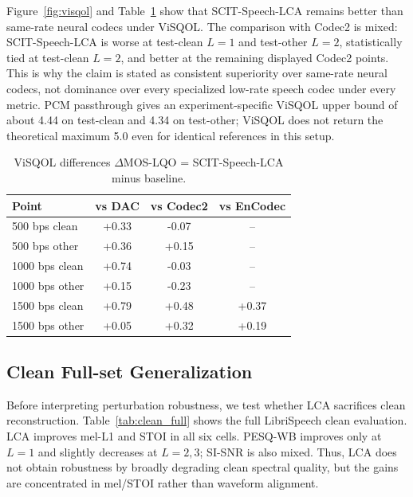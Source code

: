 \documentclass[10pt,twocolumn]{article}
\newcommand{\lca}{SCIT-Speech-LCA}
\begin{document}
Figure~\ref{fig:visqol} and Table~\ref{tab:visqol} show that \lca{} remains better than same-rate neural codecs under ViSQOL. The comparison with Codec2 is mixed: \lca{} is worse at test-clean \(L=1\) and test-other \(L=2\), statistically tied at test-clean \(L=2\), and better at the remaining displayed Codec2 points. This is why the claim is stated as consistent superiority over same-rate neural codecs, not dominance over every specialized low-rate speech codec under every metric. PCM passthrough gives an experiment-specific ViSQOL upper bound of about 4.44 on test-clean and 4.34 on test-other; ViSQOL does not return the theoretical maximum 5.0 even for identical references in this setup.

\begin{table}[t]
\centering
\caption{ViSQOL differences \(\Delta\)MOS-LQO = \lca{} minus baseline.}
\label{tab:visqol}
\small
\begin{tabular}{lccc}
\toprule
Point & vs DAC & vs Codec2 & vs EnCodec \\
\midrule
500 bps clean & +0.33 & -0.07 & -- \\
500 bps other & +0.36 & +0.15 & -- \\
1000 bps clean & +0.74 & -0.03 & -- \\
1000 bps other & +0.15 & -0.23 & -- \\
1500 bps clean & +0.79 & +0.48 & +0.37 \\
1500 bps other & +0.05 & +0.32 & +0.19 \\
\bottomrule
\end{tabular}
\end{table}

\subsection{Clean Full-set Generalization}

Before interpreting perturbation robustness, we test whether LCA sacrifices clean reconstruction. Table~\ref{tab:clean_full} shows the full LibriSpeech clean evaluation. LCA improves mel-L1 and STOI in all six cells. PESQ-WB improves only at \(L=1\) and slightly decreases at \(L=2,3\); SI-SNR is also mixed. Thus, LCA does not obtain robustness by broadly degrading clean spectral quality, but the gains are concentrated in mel/STOI rather than waveform alignment.
\end{document}
